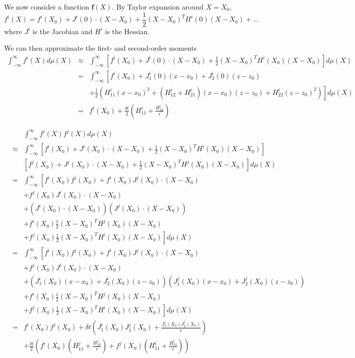 \documentclass[12pt]{article}
\begin{document}
We now consider a function $\mathbf{f}(X)$.
%
By Taylor expansion around $X=X_0$,
$$f^i(X) = f^i(X_0) + J^i(0) \cdot (X-X_0) + \frac{1}{2} (X-X_0)^T H^i(0) (X-X_0) + \dots$$
where $J^i$ is the Jacobian and $H^i$ is the Hessian. 

We can then approximate the first- and second-order moments 
\begin{eqnarray}
\int_{-\infty}^{\infty} f^i(X) d\mu(X) &\approx & \int_{-\infty}^{\infty} \left[ f^i(X_0) + J^i(0) \cdot (X-X_0) +\frac{1}{2} (X-X_0)^T H^i(X_0) (X-X_0) \right] d\mu(X) \\
&=&\int_{-\infty}^{\infty} \left[ f^i(X_0) + J^i_1(0) (x-x_0) + J^i_2(0) (z-z_0)  \right. \\
&& \left. + \frac{1}{2} \left( H^i_{11} (x-x_0)^2 + (H^i_{12} + H^i_{21}) (x-x_0) (z-z_0) + H^i_{22} (z-z_0)^2 \right)  \right] d\mu(X) \\
&=& f^i(X_0) + \frac{\delta t}{2} \left( H^i_{11} + \frac{H^i_{22}}{\epsilon} \right) 
\end{eqnarray}

\begin{eqnarray}
&&\int_{-\infty}^{\infty} f^i(X) f^j(X) d\mu(X) \\
&\approx &
\int_{-\infty}^{\infty} \left[ f^i(X_0) + J^i(X_0) \cdot (X-X_0) +\frac{1}{2} (X-X_0)^T H^i(X_0) (X-X_0) \right] \\
&& \left[ f^j(X_0) + J^j(X_0) \cdot (X-X_0) +\frac{1}{2} (X-X_0)^T H^j(X_0) (X-X_0) \right] d\mu(X) \\
&=& \int_{-\infty}^{\infty} \left[ f^i(X_0) f^j(X_0) + f^i(X_0) J^j(X_0) \cdot (X-X_0) \right. \\
&& + f^j(X_0) J^i(X_0) \cdot (X-X_0) \\
&& + \left( J^i(X_0) \cdot (X-X_0) \right) \left( J^j(X_0) \cdot (X-X_0) \right) \\
&& + f^i(X_0) \frac{1}{2} (X-X_0)^T H^j(X_0) (X-X_0) \\
&& \left. + f^j(X_0) \frac{1}{2} (X-X_0)^T H^i(X_0) (X-X_0) \right] d \mu(X) \\
&=& \int_{-\infty}^{\infty} \left[ f^i(X_0) f^j(X_0) + f^i(X_0) J^j(X_0) \cdot (X-X_0) \right. \\
&& + f^j(X_0) J^i(X_0) \cdot (X-X_0) \\
&& + \left( J^i_1(X_0)(x-x_0) + J^i_2(X_0) (z-z_0) \right) \left( J^j_1(X_0)(x-x_0) + J^j_2(X_0) (z-z_0) \right) \\
&& + f^i(X_0) \frac{1}{2} (X-X_0)^T H^j(X_0) (X-X_0) \\
&& \left. + f^j(X_0) \frac{1}{2} (X-X_0)^T H^i(X_0) (X-X_0) \right] d \mu(X)\\
&=& f^i(X_0) f^j(X_0) + \delta t \left( J_1^i(X_0) J_1^j(X_0) + \frac{J_2^i(X_0) J_2^j(X_0)}{\epsilon}  \right) \\
&& + \frac{\delta t}{2}  \left( f^i(X_0) \left( H^j_{11} + \frac{H^j_{22}}{\epsilon} \right) + f^j(X_0) \left( H^i_{11} + \frac{H^i_{22}}{\epsilon} \right) \right)
\end{eqnarray}
\end{document}

